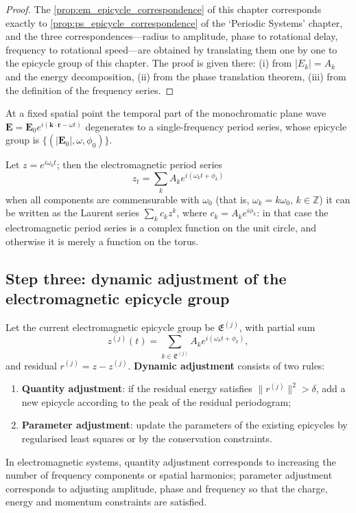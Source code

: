\begin{proof}
The \cref{prop:em_epicycle_correspondence} of this chapter corresponds exactly to \cref{prop:ps_epicycle_correspondence} of the `Periodic Systems' chapter,
and the three correspondences---radius to amplitude, phase to rotational delay, frequency to rotational speed---are obtained by translating them one by one to the epicycle group of this chapter.
The proof is given there: (i) from $|E_k|=A_k$ and the energy decomposition, (ii) from the phase translation theorem, (iii) from the definition of the frequency series.
\end{proof}

\begin{example}\label{ex:em_plane_wave_series}
At a fixed spatial point the temporal part of the monochromatic plane wave $\mathbf E=\mathbf E_0e^{i(\mathbf k\cdot\mathbf r-\omega t)}$ degenerates to a single-frequency period series, whose epicycle group is $\{(|\mathbf E_0|,\omega,\phi_0)\}$.
\end{example}

\begin{remark}\label{rem:em_series_complex}
Let $z=e^{i\omega_0t}$; then the electromagnetic period series
\[
z_t=\sum_k A_k e^{i(\omega_k t+\phi_k)}
\]
when all components are commensurable with $\omega_0$ (that is, $\omega_k=k\omega_0$, $k\in\mathbb Z$) it can be written as the Laurent series $\sum_k c_k z^k$, where $c_k=A_k e^{i\phi_k}$: in that case the electromagnetic period series is a complex function on the unit circle, and otherwise it is merely a function on the torus.
\end{remark}

\subsection{Step three: dynamic adjustment of the electromagnetic epicycle group}

\begin{definition}\label{def:em_adaptive_adjustment}
Let the current electromagnetic epicycle group be $\mathfrak E^{(j)}$, with partial sum
\[
z^{(j)}(t)=\sum_{k\in\mathfrak E^{(j)}}A_k e^{i(\omega_k t+\phi_k)},
\]
and residual $r^{(j)}=z-z^{(j)}$. \textbf{Dynamic adjustment} consists of two rules:
\begin{enumerate}[label=(\roman*)]
    \item \textbf{Quantity adjustment}: if the residual energy satisfies $\|r^{(j)}\|^2>\delta$, add a new epicycle according to the peak of the residual periodogram;
    \item \textbf{Parameter adjustment}: update the parameters of the existing epicycles by regularised least squares or by the conservation constraints.
\end{enumerate}
In electromagnetic systems, quantity adjustment corresponds to increasing the number of frequency components or spatial harmonics; parameter adjustment corresponds to adjusting amplitude, phase and frequency so that the charge, energy and momentum constraints are satisfied.
\end{definition}

